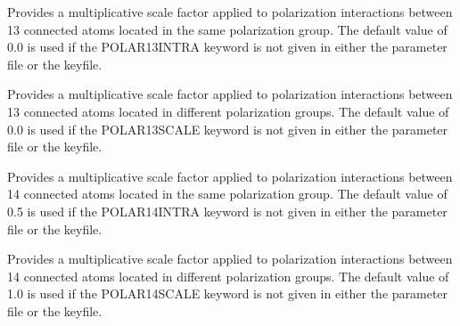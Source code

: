 \documentclass[letterpaper,11pt,english]{sphinxmanual}
\begin{document}
\ignorespaces {}\label{\detokenize{text/keywords:key-polar-13-intra}}\begin{description}
\sphinxAtStartPar
Provides a multiplicative scale factor applied to polarization interactions between 1\sphinxhyphen{}3 connected atoms located in the same polarization group. The default value of 0.0 is used if the POLAR\sphinxhyphen{}13\sphinxhyphen{}INTRA keyword is not given in either the parameter file or the keyfile.

\end{description}

\ignorespaces {}\label{\detokenize{text/keywords:key-polar-13-scale}}\begin{description}
\sphinxAtStartPar
Provides a multiplicative scale factor applied to polarization interactions between 1\sphinxhyphen{}3 connected atoms located in different polarization groups. The default value of 0.0 is used if the POLAR\sphinxhyphen{}13\sphinxhyphen{}SCALE keyword is not given in either the parameter file or the keyfile.

\end{description}

\ignorespaces {}\label{\detokenize{text/keywords:key-polar-14-intra}}\begin{description}
\sphinxAtStartPar
Provides a multiplicative scale factor applied to polarization interactions between 1\sphinxhyphen{}4 connected atoms located in the same polarization group. The default value of 0.5 is used if the POLAR\sphinxhyphen{}14\sphinxhyphen{}INTRA keyword is not given in either the parameter file or the keyfile.

\end{description}

\ignorespaces {}\label{\detokenize{text/keywords:key-polar-14-scale}}\begin{description}
\sphinxAtStartPar
Provides a multiplicative scale factor applied to polarization interactions between 1\sphinxhyphen{}4 connected atoms located in different polarization groups. The default value of 1.0 is used if the POLAR\sphinxhyphen{}14\sphinxhyphen{}SCALE keyword is not given in either the parameter file or the keyfile.

\end{description}
\end{document}

